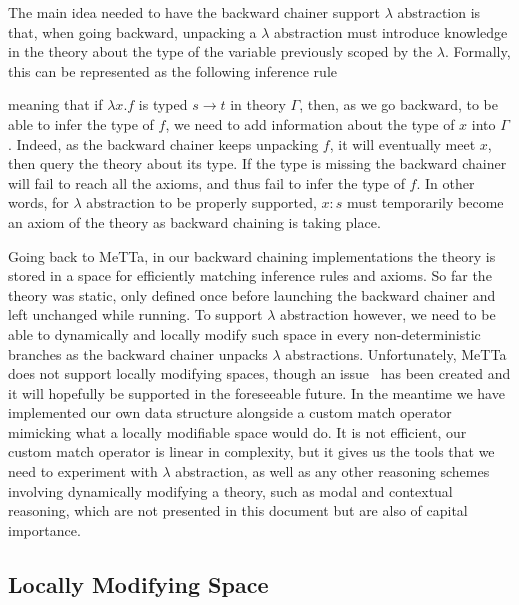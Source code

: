 \documentclass[]{report}
\begin{document}
The main idea needed to have the backward chainer support $\lambda$
abstraction is that, when going backward, unpacking a $\lambda$
abstraction must introduce knowledge in the theory about the type of
the variable previously scoped by the $\lambda$.  Formally, this can
be represented as the following inference rule
\begin{prooftree}
\end{prooftree}
meaning that if $\lambda x.f$ is typed $s \to t$ in theory $\Gamma$,
then, as we go backward, to be able to infer the type of $f$, we need
to add information about the type of $x$ into $\Gamma$.  Indeed, as
the backward chainer keeps unpacking $f$, it will eventually meet $x$,
then query the theory about its type.  If the type is missing the
backward chainer will fail to reach all the axioms, and thus fail to
infer the type of $f$.  In other words, for $\lambda$ abstraction to
be properly supported, $x: s$ must temporarily become an axiom of the
theory as backward chaining is taking place.

Going back to MeTTa, in our backward chaining implementations the
theory is stored in a space for efficiently matching inference rules
and axioms.  So far the theory was static, only defined once before
launching the backward chainer and left unchanged while running.  To
support $\lambda$ abstraction however, we need to be able to
dynamically and locally modify such space in every non-deterministic
branches as the backward chainer unpacks $\lambda$ abstractions.
Unfortunately, MeTTa does not support locally modifying spaces, though
an issue~\cite{ForkSpaceIssue} has been created and it will hopefully
be supported in the foreseeable future.  In the meantime we have
implemented our own data structure alongside a custom match operator
mimicking what a locally modifiable space would do.  It is not
efficient, our custom match operator is linear in complexity, but it
gives us the tools that we need to experiment with $\lambda$
abstraction, as well as any other reasoning schemes involving
dynamically modifying a theory, such as modal and contextual
reasoning, which are not presented in this document but are also of
capital importance.

\subsection{Locally Modifying Space}
\end{document}
